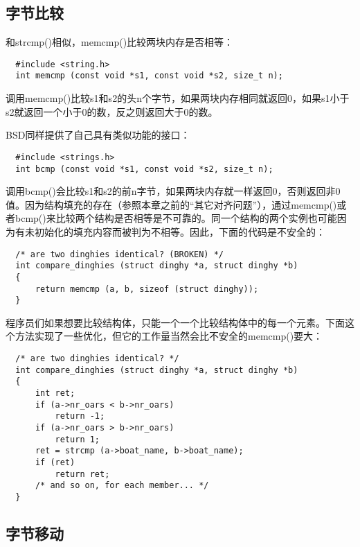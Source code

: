 \subsection{字节比较}

和strcmp()相似，memcmp()比较两块内存是否相等： 

\begin{lstlisting}
  #include <string.h>
  int memcmp (const void *s1, const void *s2, size_t n);
\end{lstlisting}

调用memcmp()比较s1和s2的头n个字节，如果两块内存相同就返回0，如果s1小于s2就返回一个小于0的数，反之则返回大于0的数。

BSD同样提供了自己具有类似功能的接口：

\begin{lstlisting}
  #include <strings.h>
  int bcmp (const void *s1, const void *s2, size_t n);
\end{lstlisting}

调用bcmp()会比较s1和s2的前n字节，如果两块内存就一样返回0，否则返回非0值。因为结构填充的存在（参照本章之前的“其它对齐问题”），通过memcmp()或者bcmp()来比较两个结构是否相等是不可靠的。同一个结构的两个实例也可能因为有未初始化的填充内容而被判为不相等。因此，下面的代码是不安全的： 

\begin{lstlisting}
  /* are two dinghies identical? (BROKEN) */
  int compare_dinghies (struct dinghy *a, struct dinghy *b)
  {
      return memcmp (a, b, sizeof (struct dinghy));
  }
\end{lstlisting}

程序员们如果想要比较结构体，只能一个一个比较结构体中的每一个元素。下面这个方法实现了一些优化，但它的工作量当然会比不安全的memcmp()要大： 

\begin{lstlisting}
  /* are two dinghies identical? */
  int compare_dinghies (struct dinghy *a, struct dinghy *b)
  {
      int ret;
      if (a->nr_oars < b->nr_oars)
          return -1;
      if (a->nr_oars > b->nr_oars)
          return 1;
      ret = strcmp (a->boat_name, b->boat_name);
      if (ret)
          return ret;
      /* and so on, for each member... */
  }
\end{lstlisting}

\subsection{字节移动}

